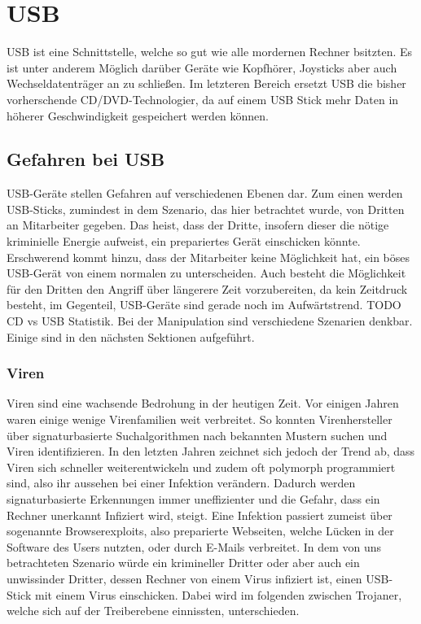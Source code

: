 \chapter{USB}
USB ist eine Schnittstelle, welche so gut wie alle mordernen Rechner bsitzten. Es ist unter anderem Möglich darüber Geräte wie Kopfhörer, Joysticks aber auch Wechseldatenträger an zu schließen. Im letzteren Bereich ersetzt USB die bisher vorherschende CD/DVD-Technologier, da auf einem USB Stick mehr Daten in höherer Geschwindigkeit gespeichert werden können.
\section{Gefahren bei USB}\label{GefBeiUSB}
USB-Geräte stellen Gefahren auf verschiedenen Ebenen dar. Zum einen werden USB-Sticks, zumindest in dem Szenario, das hier betrachtet wurde, von Dritten an Mitarbeiter gegeben. Das heist, dass der Dritte, insofern dieser die nötige kriminielle Energie aufweist, ein prepariertes Gerät einschicken könnte. Erschwerend kommt hinzu, dass der Mitarbeiter keine Möglichkeit hat, ein böses USB-Gerät von einem normalen zu unterscheiden. Auch besteht die Möglichkeit für den Dritten den Angriff über längerere Zeit vorzubereiten, da kein Zeitdruck besteht, im Gegenteil, USB-Geräte sind gerade noch im Aufwärtstrend. TODO CD vs USB Statistik. Bei der Manipulation sind verschiedene Szenarien denkbar. Einige sind in den nächsten Sektionen aufgeführt.

\subsection{Viren}
Viren sind eine wachsende Bedrohung in der heutigen Zeit. Vor einigen Jahren waren einige wenige Virenfamilien weit verbreitet. So konnten Virenhersteller über signaturbasierte Suchalgorithmen nach bekannten Mustern suchen und Viren identifizieren. In den letzten Jahren zeichnet sich jedoch der Trend ab, dass Viren sich schneller weiterentwickeln und zudem oft polymorph programmiert sind, also ihr aussehen bei einer Infektion verändern. Dadurch werden signaturbasierte Erkennungen immer uneffizienter und die Gefahr, dass ein Rechner unerkannt Infiziert wird, steigt. Eine Infektion passiert zumeist über sogenannte Browserexploits, also preparierte Webseiten, welche Lücken in der Software des Users nutzten, oder durch E-Mails verbreitet. In dem von uns betrachteten Szenario würde ein krimineller Dritter oder aber auch ein unwissinder Dritter, dessen Rechner von einem Virus infiziert ist, einen USB-Stick mit einem Virus einschicken. Dabei wird im folgenden zwischen Trojaner, welche sich auf der Treiberebene einnissten, unterschieden.

